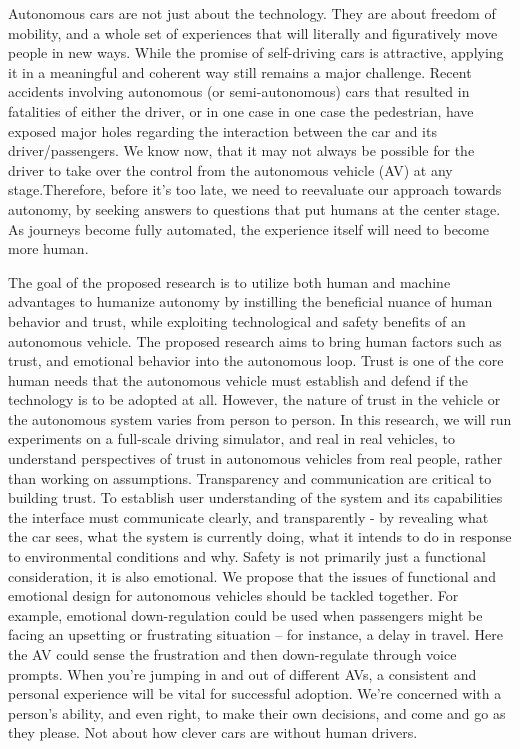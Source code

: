 

Autonomous cars are not just about the technology. They are about freedom of mobility, and a whole set of experiences that will literally and figuratively move people in new ways.
While the promise of self-driving cars is attractive, applying it in a meaningful and coherent way still remains a major challenge. Recent accidents involving autonomous (or semi-autonomous) cars that resulted in fatalities of either the driver, or in one case in one case the pedestrian, have exposed major holes regarding the interaction between the car and its driver/passengers. We know now, that it may not always be possible for the driver to take over the control from the autonomous vehicle (AV) at any stage.Therefore, before it’s too late, we need to reevaluate our approach towards autonomy, by seeking answers to questions that put humans at the center stage. As journeys become fully automated, the experience itself will need to become more human. 

The goal of the proposed research is to utilize both human and machine advantages to humanize autonomy  by instilling the beneficial nuance of human behavior and trust, while exploiting technological and safety benefits of an autonomous vehicle. The proposed research aims to bring human factors such as trust, and emotional behavior into the autonomous loop.   Trust is one of the core human needs that the autonomous vehicle must establish and defend if the technology is to be adopted at all. However, the nature of trust in the vehicle or the autonomous system varies from person to person. In this research, we will run experiments on a full-scale driving simulator, and real in real vehicles, to understand perspectives of trust in autonomous vehicles from real people, rather than working on assumptions. Transparency and communication are critical to building trust. To establish user understanding of the system and its capabilities the interface must communicate clearly, and transparently - by revealing what the car sees, what the system is currently doing, what it intends to do in response to environmental conditions and why. 
Safety is not primarily just a functional consideration, it is also emotional. We propose that the issues of functional and emotional design for autonomous vehicles should be tackled together.
For example, emotional down-regulation could be used when passengers might be facing an upsetting or frustrating situation – for instance, a delay in travel. Here the AV could sense the frustration and then down-regulate through voice prompts. When you’re jumping in and out of different AVs, a consistent and personal experience will be vital for successful adoption.
 We’re concerned with a person’s ability, and even right, to make their own decisions, and come and go as they please. Not about how clever cars are without human drivers. 

